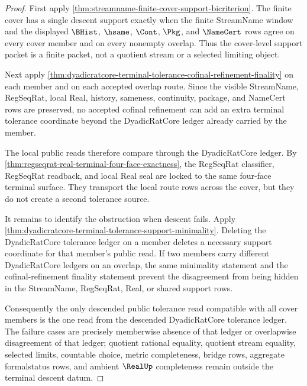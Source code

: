 \begin{proof}
First apply \autoref{thm:streamname-finite-cover-support-bicriterion}. The finite cover has a single descent support exactly when the finite StreamName window and the displayed $\BHist$, $\hsame$, $\Cont$, $\Pkg$, and $\NameCert$ rows agree on every cover member and on every nonempty overlap. Thus the cover-level support packet is a finite packet, not a quotient stream or a selected limiting object.

Next apply \autoref{thm:dyadicratcore-terminal-tolerance-cofinal-refinement-finality} on each member and on each accepted overlap route. Since the visible StreamName, RegSeqRat, local Real, history, sameness, continuity, package, and NameCert rows are preserved, no accepted cofinal refinement can add an extra terminal tolerance coordinate beyond the DyadicRatCore ledger already carried by the member.

The local public reads therefore compare through the DyadicRatCore ledger. By \autoref{thm:regseqrat-real-terminal-four-face-exactness}, the RegSeqRat classifier, RegSeqRat readback, and local Real seal are locked to the same four-face terminal surface. They transport the local route rows across the cover, but they do not create a second tolerance source.

It remains to identify the obstruction when descent fails. Apply \autoref{thm:dyadicratcore-terminal-tolerance-support-minimality}. Deleting the DyadicRatCore tolerance ledger on a member deletes a necessary support coordinate for that member's public read. If two members carry different DyadicRatCore ledgers on an overlap, the same minimality statement and the cofinal-refinement finality statement prevent the disagreement from being hidden in the StreamName, RegSeqRat, Real, or shared support rows.

Consequently the only descended public tolerance read compatible with all cover members is the one read from the descended DyadicRatCore tolerance ledger. The failure cases are precisely memberwise absence of that ledger or overlapwise disagreement of that ledger; quotient rational equality, quotient stream equality, selected limits, countable choice, metric completeness, bridge rows, aggregate formalstatus rows, and ambient $\RealUp$ completeness remain outside the terminal descent datum.
\end{proof}

